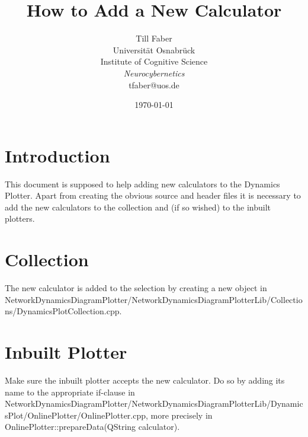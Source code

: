 \documentclass[a4paper, 12pt]{article}
\begin{document}
\title{How to Add a New Calculator}
\author{
        Till Faber \\
        Universit\"{a}t Osnabr\"{u}ck\\
        Institute of Cognitive Science\\
        \textit{Neurocybernetics}\\
        tfaber@uos.de        
        }
\date{\today}
\maketitle

\section*{Introduction}
This document is supposed to help adding new calculators to the Dynamics Plotter. Apart from creating the obvious source and header files it is necessary to add the new calculators to the collection and (if so wished) to the inbuilt plotters.

\section*{Collection}
   The new calculator is added to the selection by creating a new object in NetworkDynamics\-DiagramPlotter/\-NetworkDynamicsDiagramPlotterLib/\-Collections/\-DynamicsPlotCollection.cpp. 
   
\section*{Inbuilt Plotter}
   Make sure the inbuilt plotter accepts the new calculator. Do so by adding its name to the appropriate if-clause in NetworkDynamicsDiagramPlotter/\-NetworkDynamics\-DiagramPlotterLib/\-DynamicsPlot/\-OnlinePlotter/\-OnlinePlotter.cpp, more precisely in OnlinePlotter::prepareData(QString calculator). 
      
   
\end{document}
